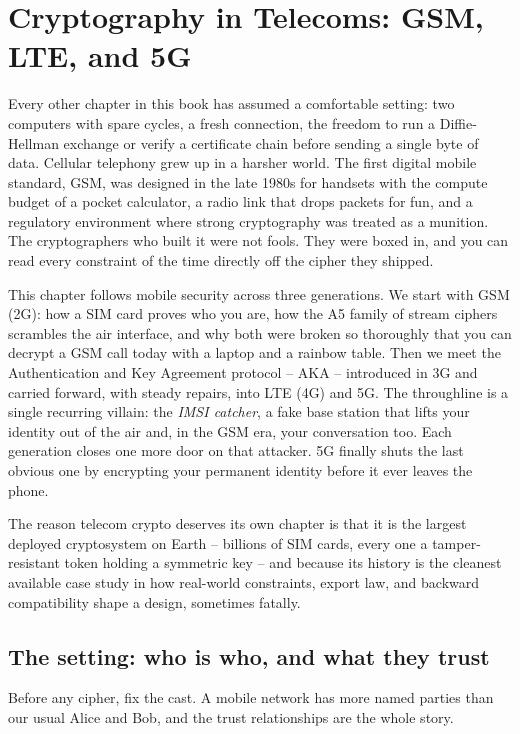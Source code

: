 \chapter{Cryptography in Telecoms: GSM, LTE, and 5G}

Every other chapter in this book has assumed a comfortable setting: two computers with spare cycles, a fresh connection, the freedom to run a Diffie-Hellman exchange or verify a certificate chain before sending a single byte of data. Cellular telephony grew up in a harsher world. The first digital mobile standard, GSM, was designed in the late 1980s for handsets with the compute budget of a pocket calculator, a radio link that drops packets for fun, and a regulatory environment where strong cryptography was treated as a munition. The cryptographers who built it were not fools. They were boxed in, and you can read every constraint of the time directly off the cipher they shipped.

This chapter follows mobile security across three generations. We start with GSM (2G): how a SIM card proves who you are, how the A5 family of stream ciphers scrambles the air interface, and why both were broken so thoroughly that you can decrypt a GSM call today with a laptop and a rainbow table. Then we meet the Authentication and Key Agreement protocol -- AKA -- introduced in 3G and carried forward, with steady repairs, into LTE (4G) and 5G. The throughline is a single recurring villain: the \emph{IMSI catcher}, a fake base station that lifts your identity out of the air and, in the GSM era, your conversation too. Each generation closes one more door on that attacker. 5G finally shuts the last obvious one by encrypting your permanent identity before it ever leaves the phone.

The reason telecom crypto deserves its own chapter is that it is the largest deployed cryptosystem on Earth -- billions of SIM cards, every one a tamper-resistant token holding a symmetric key -- and because its history is the cleanest available case study in how real-world constraints, export law, and backward compatibility shape a design, sometimes fatally.

\section{The setting: who is who, and what they trust}
\label{ch29:setting}

Before any cipher, fix the cast. A mobile network has more named parties than our usual Alice and Bob, and the trust relationships are the whole story.

